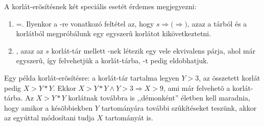 \label{erosit}


A korlát-erõsítésnek két speciális esetét érdemes megjegyezni:

\begin{enumerate}
\item {}=. Ilyenkor a -re vonatkozó feltétel az, hogy
$s\Rightarrow($$\Rightarrow$$)$, azaz a tárból és a  korlátból
megpróbálunk egy egyszerû  korlátot kikövetkeztetni.
\item {}, azaz az $s$ korlát-tár mellett -nek létezik egy
vele ekvivalens  párja, ahol  már egyszerû, így felvehetjük
a korlát-tárba, -t pedig eldobhatjuk.
\end{enumerate}

Egy példa korlát-erõsítésre: a korlát-tár tartalma legyen ${Y>3}$, az
összetett korlát pedig $X>Y*Y$. Ekkor $X>Y*Y \land Y>3 \Rightarrow X>9$, ami már
felvehetõ a korlát-tárba. Az $X>Y*Y$ korlátnak továbbra is ,,démonként'' életben
kell maradnia, hogy amikor a késõbbiekben $Y$ tartományára további szûkítéseket
teszünk, akkor az egyúttal módosítani tudja $X$ tartományát is.

